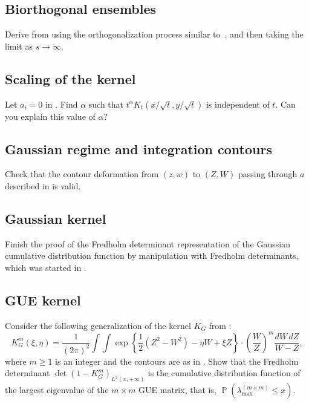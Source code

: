 \documentclass[letterpaper,11pt,oneside,reqno]{book}
\numberwithin{equation}{chapter}  %
\theoremstyle{definition}
\begin{document}
\subsection{Biorthogonal ensembles}
\label{lecture11:prob:biorthogonal}

Derive  from
using the orthogonalization process similar
to~,
and then taking the limit as $s\to\infty$.

\subsection{Scaling of the kernel}
\label{lecture11:prob:scaling}

Let $a_i=0$ in .
Find $\alpha$ such that
$t^\alpha K_t(x/\sqrt{t},y/\sqrt{t})$ is independent of $t$.
Can you explain this value of $\alpha$?

\subsection{Gaussian regime and integration contours}

Check that the contour deformation
from $(z,w)$ to $(Z,W)$ passing through $a$
described in
 is valid.

\subsection{Gaussian kernel}
\label{lecture11:prob:Gaussian_kernel}

Finish the proof of the Fredholm determinant representation
of the Gaussian cumulative distribution function
by manipulation with Fredholm determinants, which was started in
.

\subsection{GUE kernel}
\label{lecture11:prob:GUE-kernel}

Consider the following generalization of the kernel $K_G$
from :
\begin{equation*}
	K_G^m(\xi,\eta)=
	\frac{1}{(2\pi)^2}
	\int \int
	\exp\left\{
		\frac{1}{2}(Z^2-W^2)-\eta W+\xi Z
	\right\}\cdot
	\left(
	\frac{W}{Z}
\right)^{m}
\frac{dW\,dZ}{W-Z},
\end{equation*}
where $m\ge1$ is an integer and the contours are as in .
Show that the Fredholm determinant
$\det\left( 1-K_G^m \right)_{L^2(x,+\infty)}$
is the cumulative distribution function of the largest eigenvalue
of the $m\times m$ GUE matrix,
that is, $\operatorname{\mathbb{P}}(\lambda_{\max}^{(m\times m)}\le x)$.
\end{document}
